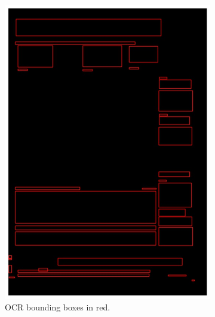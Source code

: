 \documentclass[oneside, english, bibtex]{kththesis}
\begin{document}
\begin{figure}[!htb]
\begin{adjustbox}{center,max size={\textwidth}{0.9\textheight}}
\parbox{1.5\textwidth}{\lineskip=0pt
\begin{subfigure}{0.6\textwidth}
  \centering
  \includegraphics[width=\linewidth, clip=true, trim = 0mm 0mm 0mm 0mm]{figures/ocr/JIefsDa.jpg}
  \caption{OCR bounding boxes in red.}
  \label{fig:JIefsDa_OCR}
\end{subfigure}%
\begin{subfigure}{0.6\textwidth}
  \centering

\end{subfigure}}
\end{adjustbox}
\end{figure}
\end{document}

